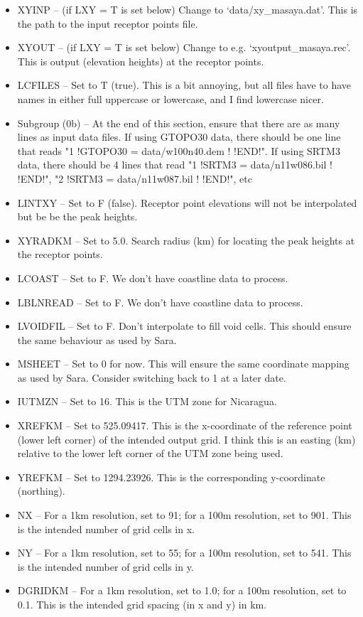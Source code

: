 \documentclass[10pt,a4paper]{article}
\begin{document}
\begin{itemize}
\begin{itemize}
\item XYINP -- (if LXY = T is set below) Change to `data/xy\_masaya.dat'. This is the path to the input receptor points file.
\item XYOUT -- (if LXY = T is set below) Change to e.g. `xyoutput\_masaya.rec'. This is output (elevation heights) at the receptor points.
\item LCFILES -- Set to T (true). This is a bit annoying, but all files have to have names in either full uppercase or lowercase, and I find lowercase nicer.
\item Subgroup (0b) -- At the end of this section, ensure that there are as many lines as input data files. If using GTOPO30 data, there should be one line that reads "1 !GTOPO30 = data/w100n40.dem !     !END!". If using SRTM3 data, there should be 4 lines that read "1 !SRTM3 = data/n11w086.bil !     !END!", "2 !SRTM3 = data/n11w087.bil !     !END!", etc
\item LINTXY -- Set to F (false). Receptor point elevations will not be interpolated but be be the peak heights.
\item XYRADKM -- Set to 5.0. Search radius (km) for locating the peak heights at the receptor points.
\item LCOAST -- Set to F. We don't have coastline data to process.
\item LBLNREAD -- Set to F. We don't have coastline data to process.
\item LVOIDFIL -- Set to F. Don't interpolate to fill void cells. This should ensure the same behaviour as used by Sara.
\item MSHEET -- Set to 0 for now. This will ensure the same coordinate mapping as used by Sara. Consider switching back to 1 at a later date.
\item IUTMZN -- Set to 16. This is the UTM zone for Nicaragua.
\item XREFKM -- Set to 525.09417. This is the x-coordinate of the reference point (lower left corner) of the intended output grid. I think this is an easting (km) relative to the lower left corner of the UTM zone being used.
\item YREFKM -- Set to 1294.23926. This is the corresponding y-coordinate (northing).
\item NX -- For a 1km resolution, set to 91; for a 100m resolution, set to 901. This is the intended number of grid cells in x.
\item NY -- For a 1km resolution, set to 55; for a 100m resolution, set to 541. This is the intended number of grid cells in y.
\item DGRIDKM -- For a 1km resolution, set to 1.0; for a 100m resolution, set to 0.1. This is the intended grid spacing (in x and y) in km.
\end{itemize}
\end{itemize}
\end{document}
